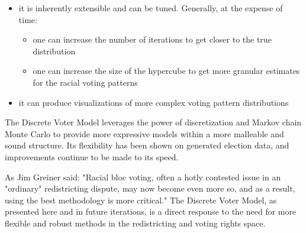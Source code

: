 \begin{itemize}
  \item it is inherently extensible and can be tuned. Generally, at the expense of time:
  \begin{itemize}
    \item one can increase the number of iterations to get closer to the true distribution
    \item one can increase the size of the hypercube to get more granular estimates for the racial voting patterns
  \end{itemize}
  \item it can produce visualizations of more complex voting pattern distributions
\end{itemize}

The Discrete Voter Model leverages the power of discretization and Markov chain Monte Carlo to provide more expressive models within a more malleable and sound structure. Its flexibility has been shown on generated election data, and improvements continue to be made to its speed.

As Jim Greiner said: "Racial bloc voting, often a hotly contested issue in an "ordinary" redistricting dispute, may now become even more so, and as a result, using the best methodology is more critical."\cite{greiner} The Discrete Voter Model, as presented here and in future iterations, is a direct response to the need for more flexible and robust methods in the redistricting and voting rights space.

